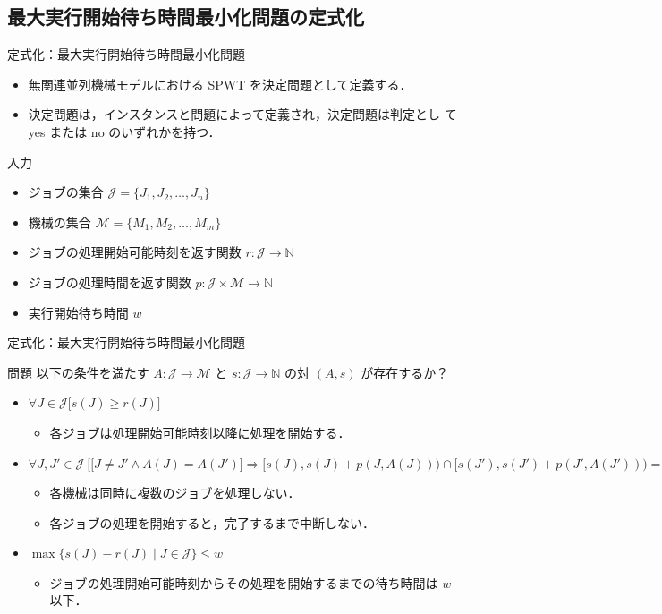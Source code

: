 \documentclass[dvipdfmx]{beamer}
\begin{document}
\subsection{最大実行開始待ち時間最小化問題の定式化}
\begin{frame}{定式化：最大実行開始待ち時間最小化問題}
  \begin{itemize}
    \item {無関連並列機械モデルにおける SPWT を決定問題として定義する．}
    \item {決定問題は，インスタンスと問題によって定義され，決定問題は判定とし
    て yes または no のいずれかを持つ．}
  \end{itemize}
  \begin{block}{入力}
    \begin{itemize}
      \item {ジョブの集合 $\mathcal{J} = \{J_1,J_2,\ldots,J_n\}$}
      \item {機械の集合 $\mathcal{M} = \{M_1,M_2,\ldots,M_m\}$}
      \item {ジョブの処理開始可能時刻を返す関数 $r : \mathcal{J} \to \mathbb{N}$}
      \item {ジョブの処理時間を返す関数 $p : \mathcal{J} \times \mathcal{M} \to \mathbb{N}$}
      \item {実行開始待ち時間 $w$}
    \end{itemize}
  \end{block}
\end{frame}

\begin{frame}{定式化：最大実行開始待ち時間最小化問題}
  \begin{block}{問題}
    以下の条件を満たす $A : \mathcal{J} \to \mathcal{M}$ と $s : \mathcal{J} \to \mathbb{N}$ の対 $(A,s)$ が存在するか？
    \begin{itemize}
      \item {$\forall J \in \mathcal{J}\big[s(J) \ge r(J) \big]$}
      \begin{itemize}
        \item {各ジョブは処理開始可能時刻以降に処理を開始する．}
      \end{itemize}
      \item {$\forall J, J' \in \mathcal{J}\ \Big[ \big[J\ne J' \land A(J) = A(J')\big] \Rightarrow [s(J), s(J)+p(J,A(J))) \cap[s(J'), s(J')+p(J', A(J'))) = \emptyset \Big]$}
      \begin{itemize}
        \item {各機械は同時に複数のジョブを処理しない．}
        \item {各ジョブの処理を開始すると，完了するまで中断しない．}
      \end{itemize}
      \item {$\max\big\{s(J) - r(J) \mid J \in \mathcal{J}\big\} \le w$}
      \begin{itemize}
        \item {ジョブの処理開始可能時刻からその処理を開始するまでの待ち時間は $w$ 以下．}
      \end{itemize}
    \end{itemize}
  \end{block}
\end{frame}
\end{document}
